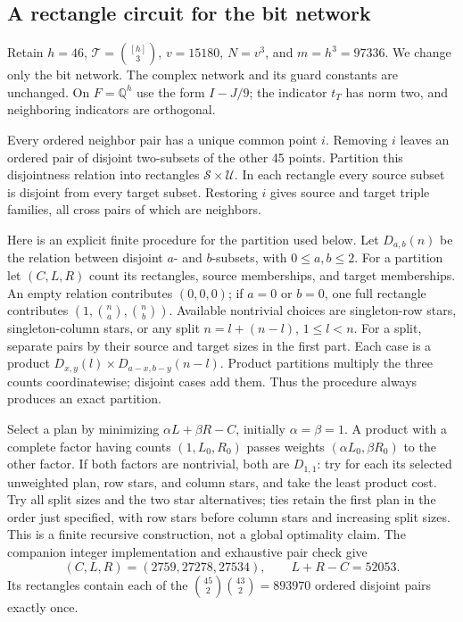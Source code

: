 \subsection{A rectangle circuit for the bit network}
\label{sec:incidence-circuit}
Retain $h=46$, $\mathcal T=\binom{[h]}3$, $v=15180$, $N=v^3$, and
$m=h^3=97336$. We change only the bit network. The complex network and its
guard constants are unchanged. On $F=\mathbb Q^h$ use the form $I-J/9$;
the indicator $t_T$ has norm two, and neighboring indicators are orthogonal.

Every ordered neighbor pair has a unique common point $i$. Removing $i$
leaves an ordered pair of disjoint two-subsets of the other 45 points.
Partition this disjointness relation into rectangles $\mathcal S\times
\mathcal U$. In each rectangle every source subset is disjoint from every
target subset. Restoring $i$ gives source and target triple families, all
cross pairs of which are neighbors.

Here is an explicit finite procedure for the partition used below. Let
$D_{a,b}(n)$ be the relation between disjoint $a$- and $b$-subsets, with
$0\le a,b\le2$. For a partition let $(C,L,R)$ count its rectangles,
source memberships, and target memberships. An empty relation contributes
$(0,0,0)$; if $a=0$ or $b=0$, one full rectangle contributes
$(1,\binom na,\binom nb)$. Available nontrivial choices are singleton-row
stars, singleton-column stars, or any split $n=l+(n-l)$, $1\le l<n$.
For a split, separate pairs by their source and target sizes in the first
part. Each case is a product
$D_{x,y}(l)\times D_{a-x,b-y}(n-l)$.
Product partitions multiply the three counts coordinatewise; disjoint cases
add them. Thus the procedure always produces an exact partition.

Select a plan by minimizing $\alpha L+\beta R-C$, initially
$\alpha=\beta=1$. A product with a complete factor having counts $(1,L_0,R_0)$
passes weights $(\alpha L_0,\beta R_0)$ to the other factor. If both factors
are nontrivial, both are $D_{1,1}$: try for each its selected unweighted plan,
row stars, and column stars, and take the least product cost. Try all split
sizes and the two star alternatives; ties retain the first plan in the order
just specified, with row stars before column stars and increasing split sizes.
This is a finite recursive construction, not a global optimality claim.
The companion integer implementation and exhaustive pair check give
\[
 (C,L,R)=(2759,27278,27534),\qquad L+R-C=52053.
\]
Its rectangles contain each of the
$\binom{45}2\binom{43}2=893970$ ordered disjoint pairs exactly once.

